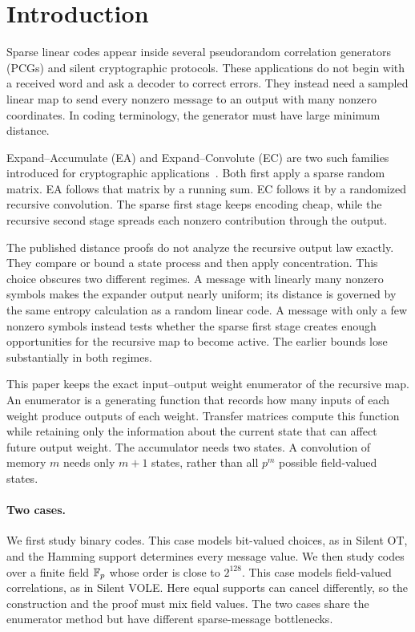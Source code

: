 \section{Introduction}
\label{sec:introduction}

Sparse linear codes appear inside several pseudorandom correlation generators
(PCGs) and silent cryptographic protocols.  These applications do not begin with a
received word and ask a decoder to correct errors.  They instead need a
sampled linear map to send every nonzero message to an output with many
nonzero coordinates.  In coding terminology, the generator must have large
minimum distance.

Expand--Accumulate (EA) and Expand--Convolute (EC) are two such families
introduced for cryptographic applications~\cite{EA,EC}.  Both first apply a
sparse random matrix.  EA follows that matrix by a running sum.  EC follows it
by a randomized recursive convolution.  The sparse first stage keeps encoding
cheap, while the recursive second stage spreads each nonzero contribution
through the output.

The published distance proofs do not analyze the recursive output law
exactly.  They compare or bound a state process and then apply concentration.
This choice obscures two different regimes.  A message with linearly many
nonzero symbols makes the expander output nearly uniform; its distance is
governed by the same entropy calculation as a random linear code.  A message
with only a few nonzero symbols instead tests whether the sparse first stage
creates enough opportunities for the recursive map to become active.  The
earlier bounds lose substantially in both regimes.

This paper keeps the exact input--output weight enumerator of the recursive
map.  An enumerator is a generating function that records how many inputs of
each weight produce outputs of each weight.  Transfer matrices compute this
function while retaining only the information about the current state that
can affect future output weight.  The accumulator needs two states.  A
convolution of memory $m$ needs only $m+1$ states, rather than all $p^m$
possible field-valued states.

\paragraph{Two cases.}
We first study binary codes.  This case models bit-valued choices, as in
Silent OT, and the Hamming support determines every message value.  We then
study codes over a finite field $\mathbb F_p$ whose order is close to $2^{128}$.
This case models field-valued correlations, as in Silent VOLE.  Here equal
supports can cancel differently, so the construction and the proof must mix
field values.  The two cases share the enumerator method but have different
sparse-message bottlenecks.

